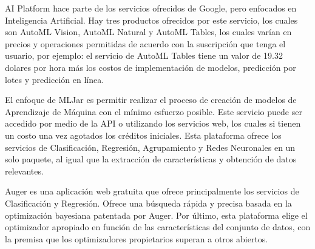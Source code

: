\begin{APAitemize}
    \item AI Platform \parencite{googleML} hace parte de los servicios ofrecidos de Google, pero enfocados en Inteligencia Artificial. Hay tres productos ofrecidos por este servicio, los cuales son AutoML Vision, AutoML Natural y AutoML Tables, los cuales varían en precios y operaciones permitidas de acuerdo con la suscripción que tenga el usuario, por ejemplo: el servicio de AutoML Tables tiene un valor de 19.32 dolares por hora más los costos de implementación de modelos, predicción por lotes y predicción en línea. 
    \item El enfoque de MLJar \parencite{mljar2018} es permitir realizar el proceso de creación de modelos de Aprendizaje de Máquina con el mínimo esfuerzo posible. Este servicio puede ser accedido por medio de la API o utilizando los servicios web, los cuales si tienen un costo una vez agotados los créditos iniciales. Esta plataforma ofrece los servicios de Clasificación, Regresión, Agrupamiento y Redes Neuronales en un solo paquete, al igual que la extracción de características y obtención de datos relevantes.
    \item Auger \parencite{Auger} es una aplicación web gratuita que ofrece principalmente los servicios de Clasificación y Regresión. Ofrece una búsqueda rápida y precisa basada en la optimización bayesiana patentada por Auger. Por último, esta plataforma elige el optimizador apropiado en función de las características del conjunto de datos, con la premisa que los optimizadores propietarios superan a otros abiertos.
\end{APAitemize}

 